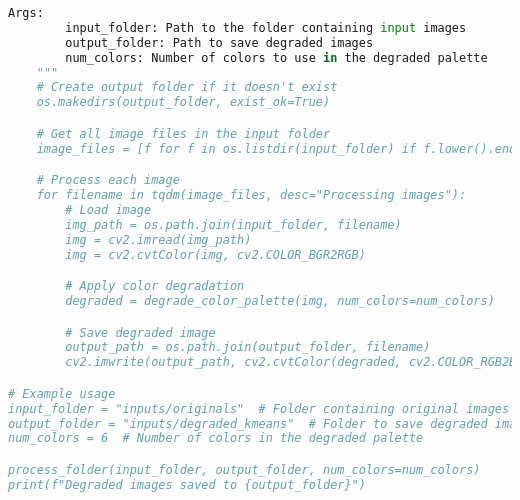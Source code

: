 \begin{sloppypar}
\begin{lstlisting}[language=Python]
    Args:
        input_folder: Path to the folder containing input images
        output_folder: Path to save degraded images
        num_colors: Number of colors to use in the degraded palette
    """
    # Create output folder if it doesn't exist
    os.makedirs(output_folder, exist_ok=True)

    # Get all image files in the input folder
    image_files = [f for f in os.listdir(input_folder) if f.lower().endswith(('.png', '.jpg', '.jpeg'))]

    # Process each image
    for filename in tqdm(image_files, desc="Processing images"):
        # Load image
        img_path = os.path.join(input_folder, filename)
        img = cv2.imread(img_path)
        img = cv2.cvtColor(img, cv2.COLOR_BGR2RGB)

        # Apply color degradation
        degraded = degrade_color_palette(img, num_colors=num_colors)

        # Save degraded image
        output_path = os.path.join(output_folder, filename)
        cv2.imwrite(output_path, cv2.cvtColor(degraded, cv2.COLOR_RGB2BGR))

# Example usage
input_folder = "inputs/originals"  # Folder containing original images
output_folder = "inputs/degraded_kmeans"  # Folder to save degraded images
num_colors = 6  # Number of colors in the degraded palette

process_folder(input_folder, output_folder, num_colors=num_colors)
print(f"Degraded images saved to {output_folder}")

\end{lstlisting}
\end{sloppypar}
